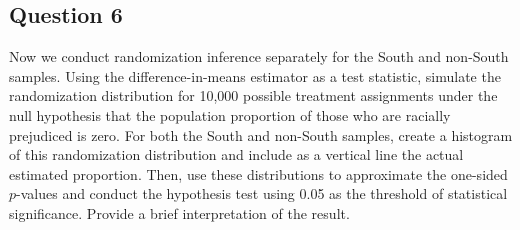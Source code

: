 \documentclass[]{article}
\begin{document}
\subsection{Question 6}\label{question-6}

Now we conduct randomization inference separately for the South and
non-South samples. Using the difference-in-means estimator as a test
statistic, simulate the randomization distribution for 10,000 possible
treatment assignments under the null hypothesis that the population
proportion of those who are racially prejudiced is zero. For both the
South and non-South samples, create a histogram of this randomization
distribution and include as a vertical line the actual estimated
proportion. Then, use these distributions to approximate the one-sided
$p$-values and conduct the hypothesis test using 0.05 as the threshold
of statistical significance. Provide a brief interpretation of the
result.
\end{document}
